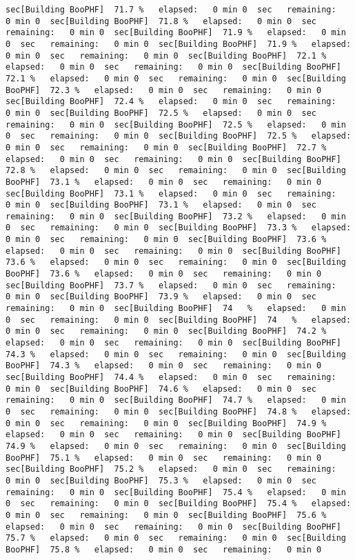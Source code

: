 \documentclass[
]{book}
\begin{document}
\begin{verbatim}
sec[Building BooPHF]  71.7 %   elapsed:   0 min 0  sec   remaining:   0 min 0  sec[Building BooPHF]  71.8 %   elapsed:   0 min 0  sec   remaining:   0 min 0  sec[Building BooPHF]  71.9 %   elapsed:   0 min 0  sec   remaining:   0 min 0  sec[Building BooPHF]  71.9 %   elapsed:   0 min 0  sec   remaining:   0 min 0  sec[Building BooPHF]  72.1 %   elapsed:   0 min 0  sec   remaining:   0 min 0  sec[Building BooPHF]  72.1 %   elapsed:   0 min 0  sec   remaining:   0 min 0  sec[Building BooPHF]  72.3 %   elapsed:   0 min 0  sec   remaining:   0 min 0  sec[Building BooPHF]  72.4 %   elapsed:   0 min 0  sec   remaining:   0 min 0  sec[Building BooPHF]  72.5 %   elapsed:   0 min 0  sec   remaining:   0 min 0  sec[Building BooPHF]  72.5 %   elapsed:   0 min 0  sec   remaining:   0 min 0  sec[Building BooPHF]  72.5 %   elapsed:   0 min 0  sec   remaining:   0 min 0  sec[Building BooPHF]  72.7 %   elapsed:   0 min 0  sec   remaining:   0 min 0  sec[Building BooPHF]  72.8 %   elapsed:   0 min 0  sec   remaining:   0 min 0  sec[Building BooPHF]  73.1 %   elapsed:   0 min 0  sec   remaining:   0 min 0  sec[Building BooPHF]  73.1 %   elapsed:   0 min 0  sec   remaining:   0 min 0  sec[Building BooPHF]  73.1 %   elapsed:   0 min 0  sec   remaining:   0 min 0  sec[Building BooPHF]  73.2 %   elapsed:   0 min 0  sec   remaining:   0 min 0  sec[Building BooPHF]  73.3 %   elapsed:   0 min 0  sec   remaining:   0 min 0  sec[Building BooPHF]  73.6 %   elapsed:   0 min 0  sec   remaining:   0 min 0  sec[Building BooPHF]  73.6 %   elapsed:   0 min 0  sec   remaining:   0 min 0  sec[Building BooPHF]  73.6 %   elapsed:   0 min 0  sec   remaining:   0 min 0  sec[Building BooPHF]  73.7 %   elapsed:   0 min 0  sec   remaining:   0 min 0  sec[Building BooPHF]  73.9 %   elapsed:   0 min 0  sec   remaining:   0 min 0  sec[Building BooPHF]  74   %   elapsed:   0 min 0  sec   remaining:   0 min 0  sec[Building BooPHF]  74   %   elapsed:   0 min 0  sec   remaining:   0 min 0  sec[Building BooPHF]  74.2 %   elapsed:   0 min 0  sec   remaining:   0 min 0  sec[Building BooPHF]  74.3 %   elapsed:   0 min 0  sec   remaining:   0 min 0  sec[Building BooPHF]  74.3 %   elapsed:   0 min 0  sec   remaining:   0 min 0  sec[Building BooPHF]  74.4 %   elapsed:   0 min 0  sec   remaining:   0 min 0  sec[Building BooPHF]  74.6 %   elapsed:   0 min 0  sec   remaining:   0 min 0  sec[Building BooPHF]  74.7 %   elapsed:   0 min 0  sec   remaining:   0 min 0  sec[Building BooPHF]  74.8 %   elapsed:   0 min 0  sec   remaining:   0 min 0  sec[Building BooPHF]  74.9 %   elapsed:   0 min 0  sec   remaining:   0 min 0  sec[Building BooPHF]  74.9 %   elapsed:   0 min 0  sec   remaining:   0 min 0  sec[Building BooPHF]  75.1 %   elapsed:   0 min 0  sec   remaining:   0 min 0  sec[Building BooPHF]  75.2 %   elapsed:   0 min 0  sec   remaining:   0 min 0  sec[Building BooPHF]  75.3 %   elapsed:   0 min 0  sec   remaining:   0 min 0  sec[Building BooPHF]  75.4 %   elapsed:   0 min 0  sec   remaining:   0 min 0  sec[Building BooPHF]  75.4 %   elapsed:   0 min 0  sec   remaining:   0 min 0  sec[Building BooPHF]  75.6 %   elapsed:   0 min 0  sec   remaining:   0 min 0  sec[Building BooPHF]  75.7 %   elapsed:   0 min 0  sec   remaining:   0 min 0  sec[Building BooPHF]  75.8 %   elapsed:   0 min 0  sec   remaining:   0 min 0  
\end{verbatim}
\end{document}
